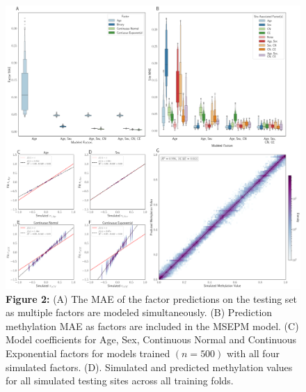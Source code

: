 \documentclass{article}
\begin{document}
{\begin{center}
    \begin{figure}
    \includegraphics[scale=.2]{Figures/Figure2.png}
    \footnotesize
    \caption*{\small \textbf{Figure 2:} (A) The MAE of the factor predictions on the testing set as multiple factors are modeled simultaneously. (B) Prediction methylation 
MAE as factors are included in the MSEPM model. (C) Model coefficients for Age, Sex, Continuous Normal and Continuous Exponential factors for models 
trained $(n = 500)$ with all four simulated factors. (D). Simulated and predicted methylation values for all simulated testing sites across all training folds. }
    \end{figure}
\end{center}


}
\end{document}
